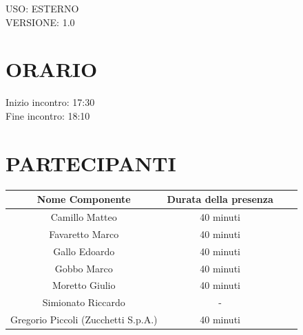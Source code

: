 \documentclass[5pt]{article}
\begin{document}
\begin{flushright}
    \begin{spacing}{1}
        USO: ESTERNO\\
        VERSIONE: 1.0\\
    \end{spacing}
\end{flushright}


\restoregeometry

\pagebreak


\section{ORARIO}
\begin{spacing}{1.5}
    {\large Inizio incontro: 17:30}\\
    {\large Fine incontro: 18:10} 
\end{spacing}

\section{PARTECIPANTI}
\setlength\cellspacetoplimit{6pt}
\setlength\cellspacebottomlimit{6pt}

\begin{table}[ht]
  \begin{tabular}{|Sc|Sc|}
    \hline
    \textbf{Nome Componente} & \textbf{Durata della presenza} \\
    \hline
    Camillo Matteo & 40 minuti \\
    Favaretto Marco & 40 minuti \\
    Gallo Edoardo & 40 minuti \\
    Gobbo Marco & 40 minuti \\
    Moretto Giulio & 40 minuti \\
    Simionato Riccardo &- \\
    Gregorio Piccoli (Zucchetti S.p.A.) & 40 minuti \\
    \hline
  \end{tabular}
  \label{tab:conference}
\end{table}
\end{document}
